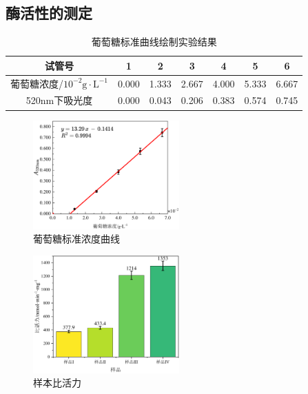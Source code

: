 \subsection{酶活性的测定}

\begin{table}[H]
\centering
\caption{葡萄糖标准曲线绘制实验结果}
\label{tab:result_GLUCOSE_STD}
\begin{tabular}{@{}ccccccc@{}}
\toprule
试管号       & 1     & 2     & 3     & 4     & 5     & 6     \\ \midrule
葡萄糖浓度/$10^{-2}\mathrm{g \cdot L^{-1}}$    & 0.000 & 1.333 & 2.667 & 4.000 & 5.333 & 6.667 \\
520nm下吸光度 & 0.000 & 0.043 & 0.206 & 0.383 & 0.574 & 0.745 \\ \bottomrule
\end{tabular}
\end{table}

\begin{figure}[H]
    \centering
    \includegraphics[width = 0.5\textwidth]{figure/1124/Glucose_STD.pdf}
    \caption{葡萄糖标准浓度曲线}
    \label{fig:STD_Glucose}
\end{figure}

\begin{figure}[H]
    \centering
    \includegraphics[width = 0.5\textwidth]{figure/1124/Activity_Sample.pdf}
    \caption{样本比活力}
    \label{fig:Activity_Sample}
\end{figure}


